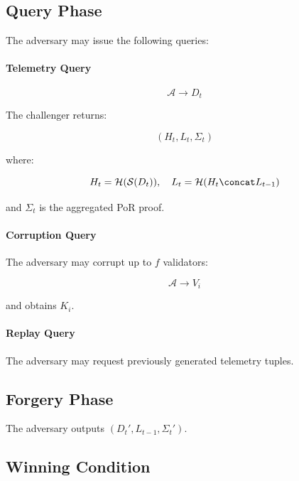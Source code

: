 \subsection{Query Phase}

The adversary may issue the following queries:

\paragraph{Telemetry Query}

\begin{equation}
\mathcal{A} \rightarrow D_t
\end{equation}

The challenger returns:

\begin{equation}
(H_t, L_t, \Sigma_t)
\end{equation}

where:

\begin{equation}
H_t = \mathcal{H}(\mathcal{S}(D_t)), \quad
L_t = \mathcal{H}(H_t \concat L_{t-1})
\end{equation}

and $\Sigma_t$ is the aggregated PoR proof.

\paragraph{Corruption Query}

The adversary may corrupt up to $f$ validators:

\begin{equation}
\mathcal{A} \rightarrow V_i
\end{equation}

and obtains $K_i$.

\paragraph{Replay Query}

The adversary may request previously generated telemetry tuples.

\subsection{Forgery Phase}

The adversary outputs $(D_t', L_{t-1}, \Sigma_t')$.

\subsection{Winning Condition}


